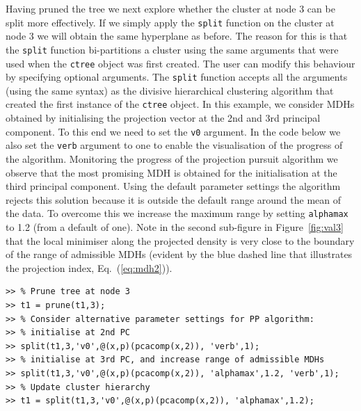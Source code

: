 \documentclass{book}
\begin{document}
Having pruned the tree we next explore whether the cluster at node 3 can be
split more effectively. If we simply apply the {\tt split} function on the
cluster at node 3 we will obtain the same hyperplane as before. The reason for
this is that the {\tt split} function bi-partitions a cluster using the same
arguments that were used when the {\tt ctree} object was first created. 
%
The user can modify this behaviour by specifying optional arguments.
%
The {\tt split} function accepts all the arguments (using
the same syntax) as the divisive hierarchical clustering algorithm
that created the first instance of the {\tt ctree} object.
%
In this example, 
we consider MDHs obtained by initialising the projection vector
at the 2nd and 3rd principal
component. To this end we need to set the {\tt v0} argument.
%
In the code below we also set the {\tt verb} argument to one to enable
the visualisation of the progress of the algorithm.
%
Monitoring the progress of the projection pursuit algorithm we observe that the
most promising MDH is obtained for the initialisation at the third principal
component. Using the default parameter settings the algorithm rejects this solution
because it is outside the default range around the mean of the data.
%
To overcome this we increase the maximum range by setting
{\tt alphamax} to 1.2 (from a default of one). Note in the second sub-figure in Figure~\ref{fig:val3}
that the local minimiser along the projected density is very close
to the boundary of the range of admissible MDHs (evident by
the blue dashed line that illustrates the projection index, Eq.~(\ref{eq:mdh2})).

\begin{verbatim}
>> % Prune tree at node 3
>> t1 = prune(t1,3);
>> % Consider alternative parameter settings for PP algorithm:
>> % initialise at 2nd PC
>> split(t1,3,'v0',@(x,p)(pcacomp(x,2)), 'verb',1);
>> % initialise at 3rd PC, and increase range of admissible MDHs
>> split(t1,3,'v0',@(x,p)(pcacomp(x,2)), 'alphamax',1.2, 'verb',1);
>> % Update cluster hierarchy
>> t1 = split(t1,3,'v0',@(x,p)(pcacomp(x,2)), 'alphamax',1.2);
\end{verbatim}
\end{document}
